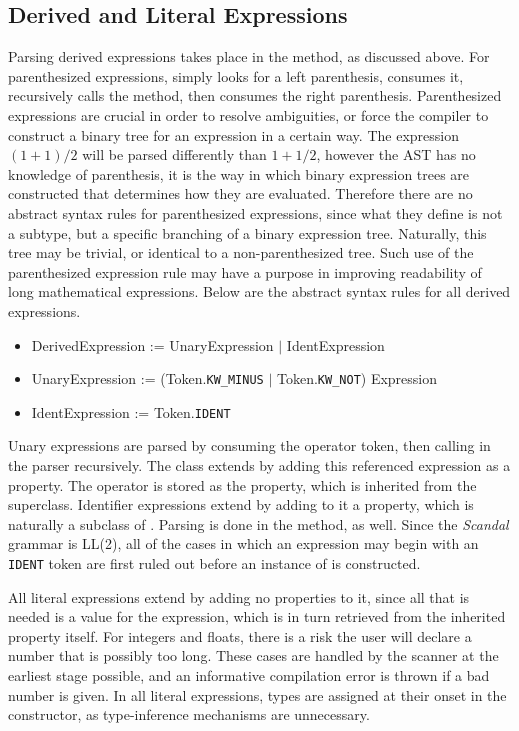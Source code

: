 \subsection{Derived and Literal Expressions}

Parsing derived expressions takes place in the  method, as discussed above. For parenthesized expressions,  simply looks for a left parenthesis, consumes it, recursively calls the  method, then consumes the right parenthesis. Parenthesized expressions are crucial in order to resolve ambiguities, or force the compiler to construct a binary tree for an expression in a certain way. The expression $(1 + 1) / 2$ will be parsed differently than $1 + 1 / 2$, however the AST has no knowledge of parenthesis, it is the way in which binary expression trees are constructed that determines how they are evaluated. Therefore there are no abstract syntax rules for parenthesized expressions, since what they define is not a subtype, but a specific branching of a binary expression tree. Naturally, this tree may be trivial, or identical to a non-parenthesized tree. Such use of the parenthesized expression rule may have a purpose in improving readability of long mathematical expressions. Below are the abstract syntax rules for all derived expressions.

\begin{itemize}
	\item DerivedExpression := UnaryExpression $|$ IdentExpression
	\item UnaryExpression := (Token.\texttt{KW\_MINUS} $|$ Token.\texttt{KW\_NOT}) Expression
	\item IdentExpression := Token.\texttt{IDENT}
\end{itemize}

Unary expressions are parsed by consuming the operator token, then calling  in the parser recursively. The  class extends  by adding this referenced expression as a property. The operator is stored as the  property, which is inherited from the superclass. Identifier expressions extend  by adding to it a  property, which is naturally a subclass of . Parsing is done in the  method, as well. Since the \emph{Scandal} grammar is LL(2), all of the cases in which an expression may begin with an \texttt{IDENT} token are first ruled out before an instance of  is constructed.

All literal expressions extend  by adding no properties to it, since all that is needed is a value for the expression, which is in turn retrieved from the inherited  property itself. For integers and floats, there is a risk the user will declare a number that is possibly too long. These cases are handled by the scanner at the earliest stage possible, and an informative compilation error is thrown if a bad number is given. In all literal expressions, types are assigned at their onset in the constructor, as type-inference mechanisms are unnecessary.

